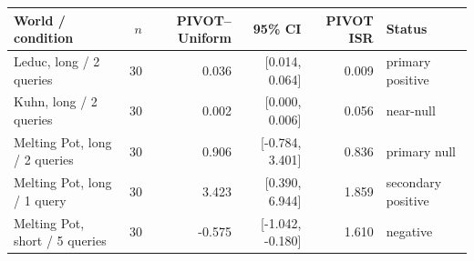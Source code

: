 \begin{tabular}{@{}lrrrrl@{}}
\toprule
World / condition & $n$ & PIVOT--Uniform & 95\% CI & PIVOT ISR & Status \\
\midrule
Leduc, long / 2 queries & 30 & 0.036 & [0.014, 0.064] & 0.009 & primary positive \\
Kuhn, long / 2 queries & 30 & 0.002 & [0.000, 0.006] & 0.056 & near-null \\
Melting Pot, long / 2 queries & 30 & 0.906 & [-0.784, 3.401] & 0.836 & primary null \\
Melting Pot, long / 1 query & 30 & 3.423 & [0.390, 6.944] & 1.859 & secondary positive \\
Melting Pot, short / 5 queries & 30 & -0.575 & [-1.042, -0.180] & 1.610 & negative \\
\bottomrule
\end{tabular}
